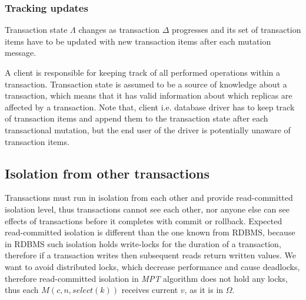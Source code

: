 \documentclass[runningheads,a4paper]{llncs}
\newcommand{\transaction}{$\Delta$\xspace}
\newcommand{\beginTransactionMessage}{$\mathit{M}(c, n, \mathit{begin\_tx}())$\xspace}
\newcommand{\initialTxStateMessage}{$\mathit{M}(n, c, \mathit{initial\_tx\_state}(\Lambda_{0}))$\xspace}
\newcommand{\selectMessage}{$\mathit{M}(c,n,select(k))$\xspace}
\newcommand{\database}{$\Omega$\xspace}
\newcommand{\txState}{$\Lambda$\xspace}
\newcommand{\mpt}{\emph{MPT}\xspace}
\begin{document}
\subsubsection{Tracking updates}

Transaction state \txState changes as transaction \transaction progresses and its set of transaction items have to be updated with new transaction items after each mutation message. 


A client is responsible for keeping track of all performed operations within a transaction. Transaction state is assumed to be a source of knowledge about a transaction, which means that it has valid information about which replicas are affected by a transaction. Note that, client i.e. database driver has to keep track of transaction items and append them to the transaction state after each transactional mutation, but the end user of the driver is potentially unaware of transaction items.

\subsection{Isolation from other transactions}
Transactions must run in isolation from each other and provide read-committed isolation level, thus transactions cannot see each other, nor anyone else can see effects of transactions before it completes with commit or rollback. Expected read-committed isolation is different than the one known from RDBMS, because in RDBMS such isolation holds write-locks for the duration of a transaction, therefore if a transaction writes then subsequent reads return written values. We want to avoid distributed locks, which decrease performance and cause deadlocks, therefore read-committed isolation in \mpt algorithm does not hold any locks, thus each \selectMessage receives current $v$, as it is in \database.
\end{document}
